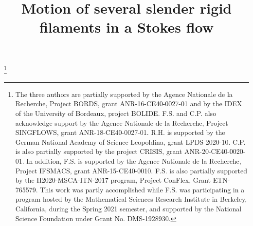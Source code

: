 \documentclass[JEP,XML,SOM,Unicode, NoEqCountersInSection,NoFloatCountersInSection,published]{cedram}
\theoremstyle{definition}
\theoremstyle{remark}
\begin{document}
\frontmatter
\title{Motion of several slender rigid filaments in a Stokes flow}

\author[\initial{R.} \middlename{M.} \lastname{Höfer}]{  }
\address{Institut de Mathématiques de Jussieu-Paris Rive Gauche, Université de Paris\\
8~Place Aurélie Nemours, F75205 Paris Cedex~13, France}

\author[\initial{C.} \lastname{Prange}]{ }
\address{Laboratoire de Mathématiques AGM, UMR CNRS 8088, Cergy Paris Université\\
2~avenue Adolphe Chauvin, F95302 Cergy-Pontoise Cedex, France}

\author[\initial{F.} \lastname{Sueur}]{ }
\address{Institut de Mathématiques de Bordeaux, UMR CNRS 5251, Université de Bordeaux\\
351~cours de la Libération, F33405 Talence Cedex, France\\
\& Institut Universitaire de France}

\thanks{The three authors are partially supported by the Agence Nationale de la Recherche, Project BORDS, grant ANR-16-CE40-0027-01 and by the IDEX of the University of Bordeaux, project BOLIDE. F.S. and C.P. also acknowledge support by the Agence Nationale de la Recherche, Project SINGFLOWS, grant ANR-18-CE40-0027-01.
R.H. is supported by the German National Academy of Science Leopoldina, grant LPDS 2020-10. C.P. is also partially supported by the project CRISIS, grant ANR-20-CE40-0020-01.
In addition, F.S. is supported by the Agence Nationale de la Recherche, Project IFSMACS, grant ANR-15-CE40-0010.
F.S. is also partially supported by the H2020-MSCA-ITN-2017 program, Project ConFlex, Grant ETN-765579. This work was partly accomplished while F.S. was participating in a program hosted by the Mathematical Sciences Research Institute in Berkeley, California, during the Spring 2021 semester, and supported by the National Science Foundation under Grant No. DMS-1928930.}
\end{document}
